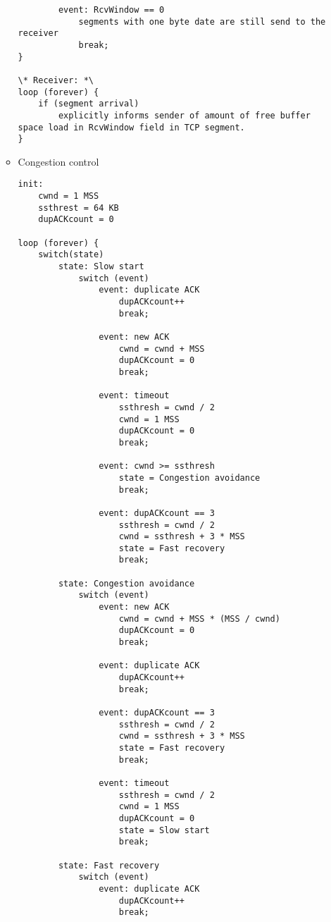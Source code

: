 \begin{enumerate}
\begin{itemize}
\begin{lstlisting}
        event: RcvWindow == 0
            segments with one byte date are still send to the receiver
            break;
}

\* Receiver: *\
loop (forever) {
    if (segment arrival)
        explicitly informs sender of amount of free buffer space load in RcvWindow field in TCP segment.
}
        \end{lstlisting}        
        \item Congestion control
        \begin{lstlisting}
init:
    cwnd = 1 MSS
    ssthrest = 64 KB
    dupACKcount = 0

loop (forever) {
    switch(state)
        state: Slow start
            switch (event)
                event: duplicate ACK
                    dupACKcount++
                    break;

                event: new ACK
                    cwnd = cwnd + MSS
                    dupACKcount = 0
                    break;

                event: timeout
                    ssthresh = cwnd / 2
                    cwnd = 1 MSS
                    dupACKcount = 0
                    break;

                event: cwnd >= ssthresh
                    state = Congestion avoidance
                    break;

                event: dupACKcount == 3
                    ssthresh = cwnd / 2
                    cwnd = ssthresh + 3 * MSS
                    state = Fast recovery
                    break;

        state: Congestion avoidance
            switch (event)
                event: new ACK
                    cwnd = cwnd + MSS * (MSS / cwnd) 
                    dupACKcount = 0
                    break;

                event: duplicate ACK
                    dupACKcount++
                    break;

                event: dupACKcount == 3
                    ssthresh = cwnd / 2
                    cwnd = ssthresh + 3 * MSS
                    state = Fast recovery
                    break;

                event: timeout
                    ssthresh = cwnd / 2
                    cwnd = 1 MSS
                    dupACKcount = 0
                    state = Slow start
                    break;

        state: Fast recovery
            switch (event)
                event: duplicate ACK
                    dupACKcount++
                    break;


\end{lstlisting}
\end{itemize}
\end{enumerate}
